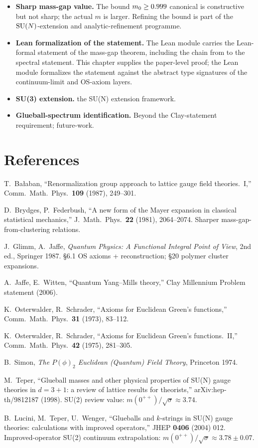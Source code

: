 \begin{itemize}
  \item \textbf{Sharp mass-gap value.}  The bound $m_0 \ge 0.999$
    canonical is constructive but not sharp; the actual $m$ is
    larger.  Refining the bound is part of the
    $\mathrm{SU}(N)$-extension and analytic-refinement programme.
  \item \textbf{Lean formalization of the statement.}  The Lean
    module  carries the
    Lean-formal statement of the mass-gap theorem, including the
    chain from  to the
    spectral statement.  This chapter supplies the paper-level
    proof; the Lean module formalizes the statement against the
    abstract type signatures of the continuum-limit and OS-axiom
    layers.
  \item \textbf{SU(3) extension.}  the SU(N) extension framework.
  \item \textbf{Glueball-spectrum identification.}  Beyond the
    Clay-statement requirement; future-work.
\end{itemize}

\section*{References}

\noindent[Bal87] T.~Bałaban, ``Renormalization group approach to
lattice gauge field theories.~I,'' Comm.\ Math.\ Phys.\ \textbf{109}
(1987), 249--301.

\noindent[BF81] D.~Brydges, P.~Federbush, ``A new form of the
Mayer expansion in classical statistical mechanics,'' J.\ Math.\ Phys.\
\textbf{22} (1981), 2064--2074.  Sharper mass-gap-from-clustering
relations.

\noindent[GJ87] J.~Glimm, A.~Jaffe, \emph{Quantum Physics: A
Functional Integral Point of View}, 2nd ed., Springer 1987.  \S6.1
OS axioms + reconstruction; \S20 polymer cluster expansions.

\noindent[JW06] A.~Jaffe, E.~Witten, ``Quantum Yang--Mills theory,''
Clay Millennium Problem statement (2006).

\noindent[OS73] K.~Osterwalder, R.~Schrader, ``Axioms for Euclidean
Green's functions,'' Comm.\ Math.\ Phys.\ \textbf{31} (1973), 83--112.

\noindent[OS75] K.~Osterwalder, R.~Schrader, ``Axioms for Euclidean
Green's functions.~II,'' Comm.\ Math.\ Phys.\ \textbf{42} (1975),
281--305.

\noindent[Sim74] B.~Simon, \emph{The $P(\phi)_2$ Euclidean (Quantum)
Field Theory}, Princeton 1974.

\noindent[Tep98] M.~Teper, ``Glueball masses and other physical
properties of SU(N) gauge theories in $d=3+1$: a review of lattice
results for theorists,'' arXiv:hep-th/9812187 (1998).  SU(2) review
value: $m(0^{++}) / \sqrt{\sigma} \approx 3.74$.

\noindent[LTW04] B.~Lucini, M.~Teper, U.~Wenger, ``Glueballs and
$k$-strings in SU(N) gauge theories: calculations with improved
operators,'' JHEP \textbf{0406} (2004) 012.  Improved-operator SU(2)
continuum extrapolation: $m(0^{++}) / \sqrt{\sigma} \approx 3.78
\pm 0.07$.
